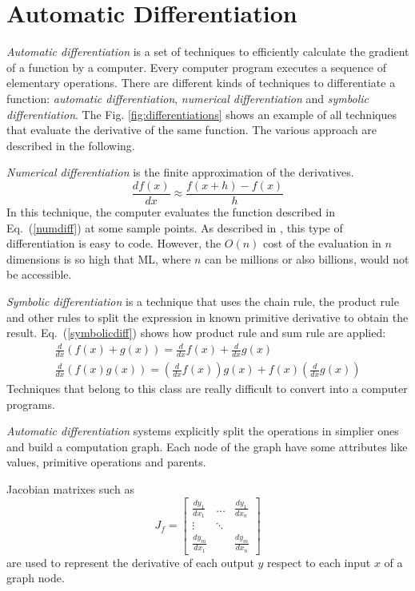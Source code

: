 \documentclass[12pt]{report}
\begin{document}
\section{Automatic Differentiation}
\textit{Automatic differentiation} is a set of techniques to efficiently calculate the gradient of a function by a computer.
Every computer program executes a sequence of elementary operations.
There are different kinds of techniques to differentiate a function: \textit{automatic differentiation}, \textit{numerical differentiation} and \textit{symbolic differentiation}.
The Fig. \ref{fig:differentiations} shows an example of all techniques that
evaluate the derivative of the same function. 
The various approach are described in the following.

\textit{Numerical differentiation} is the finite approximation of the derivatives.
\begin{equation}
    \frac{df(x)}{dx} \approx \frac{f(x+h) - f(x)}{h}
    \label{numdiff}
\end{equation}
%
In this technique, the computer evaluates the function described in Eq.~(\ref{numdiff})
at some sample points.
As described in \cite{autodiff}, this type of differentiation is easy to code.
However, the $O(n)$ cost of the evaluation in $n$ dimensions is so high
that ML, where $n$ can be millions or also billions, would not be accessible.

\textit{Symbolic differentiation} is a technique that uses the chain rule, the product rule and other rules to 
split the expression in known primitive derivative to obtain the result.
Eq.~(\ref{symbolicdiff}) shows how product rule and sum rule are applied:
%
\begin{equation}
    \begin{array}{l}
    \frac{d}{dx} (f(x) + g(x)) = \frac{d}{dx} f(x) + \frac{d}{dx}g(x) \\
    \frac{d}{dx} (f(x)g(x)) = \left(\frac{d}{dx} f(x)\right) g(x) + f(x)\left(\frac{d}{dx}g(x)\right)
    \end{array}
    \label{symbolicdiff}
\end{equation}
Techniques that belong to this class are really difficult to convert into a computer programs.

\textit{Automatic differentiation} systems explicitly split the operations in simplier ones and build a computation graph.
Each node of the graph have some attributes like values, primitive operations and parents.

Jacobian matrixes such as 
\begin{equation}
    J_f = \begin{bmatrix} 
        \frac{dy_1}{dx_1} & \dots & \frac{dy_1}{dx_n} \\
        \vdots & \ddots & \\
        \frac{dy_m}{dx_1} &        & \frac{dy_m}{dx_n}
        \end{bmatrix}
\end{equation}
are used to represent the derivative of each output $y$ respect to each input $x$ of a graph node.
\end{document}
